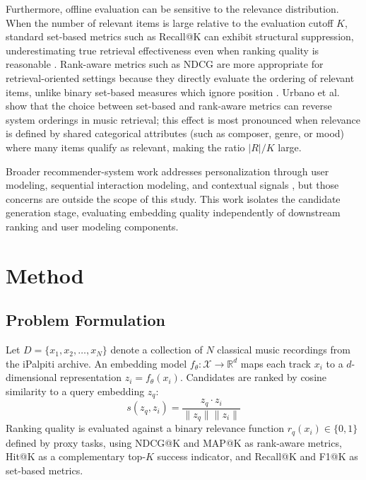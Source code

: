 \documentclass{CPP}
\begin{document}
Furthermore, offline evaluation can be sensitive to the relevance distribution. When the number of relevant items is large relative to the evaluation cutoff $K$, standard set-based metrics such as Recall@K can exhibit structural suppression, underestimating true retrieval effectiveness even when ranking quality is reasonable \cite{canamares2020}. Rank-aware metrics such as NDCG are more appropriate for retrieval-oriented settings because they directly evaluate the ordering of relevant items, unlike binary set-based measures which ignore position \cite{urbano2013}. Urbano et al.\ \cite{urbano2013} show that the choice between set-based and rank-aware metrics can reverse system orderings in music retrieval; this effect is most pronounced when relevance is defined by shared categorical attributes (such as composer, genre, or mood) where many items qualify as relevant, making the ratio $|R|/K$ large.

Broader recommender-system work addresses personalization through user modeling, sequential interaction modeling, and contextual signals \cite{lin2025, abbattista2024, schedl2021}, but those concerns are outside the scope of this study. This work isolates the candidate generation stage, evaluating embedding quality independently of downstream ranking and user modeling components.

\chapter{Method}\label{sec:method}

\section{Problem Formulation}

Let $D = \{x_1, x_2, \dots, x_N\}$ denote a collection of $N$ classical music recordings from the iPalpiti archive. An embedding model $f_\theta : \mathcal{X} \rightarrow \mathbb{R}^d$ maps each track $x_i$ to a $d$-dimensional representation $z_i = f_\theta(x_i)$. Candidates are ranked by cosine similarity to a query embedding $z_q$:
\[
s(z_q, z_i) = \frac{z_q \cdot z_i}{\|z_q\|\|z_i\|}
\]
Ranking quality is evaluated against a binary relevance function $r_q(x_i) \in \{0,1\}$ defined by proxy tasks, using NDCG@K and MAP@K as rank-aware metrics, Hit@K as a complementary top-$K$ success indicator, and Recall@K and F1@K as set-based metrics.
\end{document}
